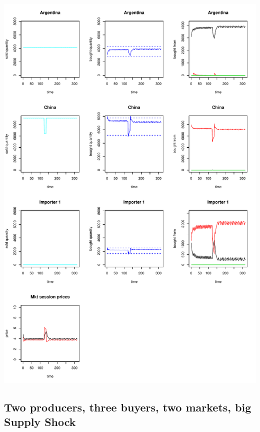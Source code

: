 \documentclass{article}
\begin{document}
\includegraphics[scale=0.55]{figs_medium}

\subsection{Two producers, three buyers, two markets, big Supply Shock}
\end{document}
